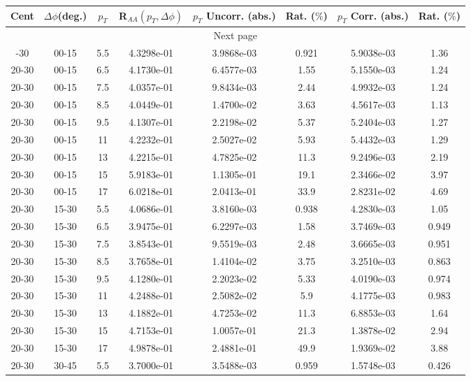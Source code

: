             
\begin{longtable}{|cccccccc|}
\hline
Cent & $\Delta\phi$(deg.) & $p_{T}$ & R$_{AA}(p_{T},\Delta\phi)$ & $p_{T}$ Uncorr. (abs.) & Rat. ($\%$) & $p_{T}$ Corr. (abs.) & Rat. ($\%$)  \\
\hline
\endhead
\hline \multicolumn{8}{|c|}{{Next page}} \\
\hline
\endfoot
\endlastfoot
\hline
20-30 & 00-15 & 5.5 & 4.3298e-01 & 3.9868e-03 & 0.921 & 5.9038e-03 & 1.36 \\ 
20-30 & 00-15 & 6.5 & 4.1730e-01 & 6.4577e-03 & 1.55 & 5.1550e-03 & 1.24 \\ 
20-30 & 00-15 & 7.5 & 4.0357e-01 & 9.8434e-03 & 2.44 & 4.9932e-03 & 1.24 \\ 
20-30 & 00-15 & 8.5 & 4.0449e-01 & 1.4700e-02 & 3.63 & 4.5617e-03 & 1.13 \\ 
20-30 & 00-15 & 9.5 & 4.1307e-01 & 2.2198e-02 & 5.37 & 5.2404e-03 & 1.27 \\ 
20-30 & 00-15 & 11 & 4.2232e-01 & 2.5027e-02 & 5.93 & 5.4432e-03 & 1.29 \\ 
20-30 & 00-15 & 13 & 4.2215e-01 & 4.7825e-02 & 11.3 & 9.2496e-03 & 2.19 \\ 
20-30 & 00-15 & 15 & 5.9183e-01 & 1.1305e-01 & 19.1 & 2.3466e-02 & 3.97 \\ 
20-30 & 00-15 & 17 & 6.0218e-01 & 2.0413e-01 & 33.9 & 2.8231e-02 & 4.69 \\ 
\hline
20-30 & 15-30 & 5.5 & 4.0686e-01 & 3.8160e-03 & 0.938 & 4.2830e-03 & 1.05 \\ 
20-30 & 15-30 & 6.5 & 3.9475e-01 & 6.2297e-03 & 1.58 & 3.7469e-03 & 0.949 \\ 
20-30 & 15-30 & 7.5 & 3.8543e-01 & 9.5519e-03 & 2.48 & 3.6665e-03 & 0.951 \\ 
20-30 & 15-30 & 8.5 & 3.7658e-01 & 1.4104e-02 & 3.75 & 3.2510e-03 & 0.863 \\ 
20-30 & 15-30 & 9.5 & 4.1280e-01 & 2.2023e-02 & 5.33 & 4.0190e-03 & 0.974 \\ 
20-30 & 15-30 & 11 & 4.2488e-01 & 2.5082e-02 & 5.9 & 4.1775e-03 & 0.983 \\ 
20-30 & 15-30 & 13 & 4.1882e-01 & 4.7253e-02 & 11.3 & 6.8853e-03 & 1.64 \\ 
20-30 & 15-30 & 15 & 4.7153e-01 & 1.0057e-01 & 21.3 & 1.3878e-02 & 2.94 \\ 
20-30 & 15-30 & 17 & 4.9878e-01 & 2.4881e-01 & 49.9 & 1.9369e-02 & 3.88 \\ 
\hline
20-30 & 30-45 & 5.5 & 3.7000e-01 & 3.5488e-03 & 0.959 & 1.5748e-03 & 0.426 \\ 

\end{longtable}
